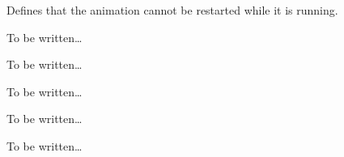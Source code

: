 \begin{command}{\pgfsys@animation@restart@whennotactive}
  Defines that the animation cannot be restarted while it is running.
\begin{codeexample}[width=3.5cm]
\end{codeexample}
\end{command}

\begin{command}{\pgfsys@animation@freezeatend{}}
  To be written\dots
\end{command}

\begin{command}{\pgfsys@animation@removeatend{}}
  To be written\dots
\end{command}

\begin{command}{\pgfsys@animation@keytime{}}
  To be written\dots
\end{command}

\begin{command}{\pgfsys@animation@keyprogress{}}
  To be written\dots
\end{command}

\begin{command}{\pgfsys@animation@keysplinecontrol{}}
  To be written\dots
\end{command}

